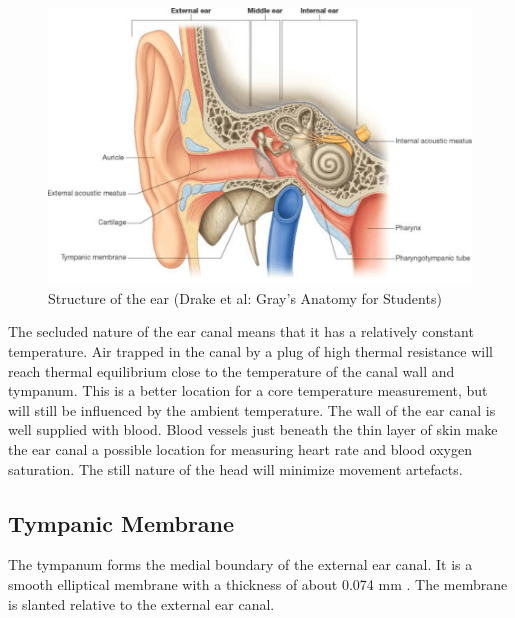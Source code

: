 \begin{figure}
   \centering
   \includegraphics[scale=0.7]{figs/EarSection}
   \caption{Structure of the ear (Drake et al: Gray's Anatomy for Students)}
   \label{fig:EarSection}
\end{figure}

\medskip
The secluded nature of the ear canal means that it has a relatively constant temperature. Air trapped in the canal by a plug of high thermal resistance will reach thermal equilibrium close to the temperature of the canal wall and tympanum. This is a better location for a core temperature measurement, but will still be influenced by the ambient temperature.
The wall of the ear canal is well supplied with blood. Blood vessels just beneath the thin layer of skin make the ear canal a possible location for measuring heart rate and blood oxygen saturation. The still nature of the head will minimize movement artefacts.


\subsection{Tympanic Membrane}
The tympanum forms the medial boundary of the external ear canal. It is a smooth elliptical membrane with a thickness of about 0.074 mm \citep{alvord1997anatomy}. The membrane is slanted relative to the external ear canal.

